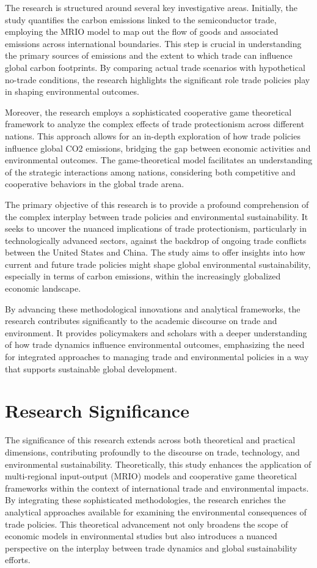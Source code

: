 The research is structured around several key investigative areas. Initially, the study quantifies the carbon emissions linked to the semiconductor trade, employing the MRIO model to map out the flow of goods and associated emissions across international boundaries. This step is crucial in understanding the primary sources of emissions and the extent to which trade can influence global carbon footprints. By comparing actual trade scenarios with hypothetical no-trade conditions, the research highlights the significant role trade policies play in shaping environmental outcomes.

Moreover, the research employs a sophisticated cooperative game theoretical framework to analyze the complex effects of trade protectionism across different nations. This approach allows for an in-depth exploration of how trade policies influence global CO2 emissions, bridging the gap between economic activities and environmental outcomes. The game-theoretical model facilitates an understanding of the strategic interactions among nations, considering both competitive and cooperative behaviors in the global trade arena.

The primary objective of this research is to provide a profound comprehension of the complex interplay between trade policies and environmental sustainability. It seeks to uncover the nuanced implications of trade protectionism, particularly in technologically advanced sectors, against the backdrop of ongoing trade conflicts between the United States and China. The study aims to offer insights into how current and future trade policies might shape global environmental sustainability, especially in terms of carbon emissions, within the increasingly globalized economic landscape.

By advancing these methodological innovations and analytical frameworks, the research contributes significantly to the academic discourse on trade and environment. It provides policymakers and scholars with a deeper understanding of how trade dynamics influence environmental outcomes, emphasizing the need for integrated approaches to managing trade and environmental policies in a way that supports sustainable global development.

\section{Research Significance}
The significance of this research extends across both theoretical and practical dimensions, contributing profoundly to the discourse on trade, technology, and environmental sustainability. Theoretically, this study enhances the application of multi-regional input-output (MRIO) models and cooperative game theoretical frameworks within the context of international trade and environmental impacts. By integrating these sophisticated methodologies, the research enriches the analytical approaches available for examining the environmental consequences of trade policies. This theoretical advancement not only broadens the scope of economic models in environmental studies but also introduces a nuanced perspective on the interplay between trade dynamics and global sustainability efforts.

